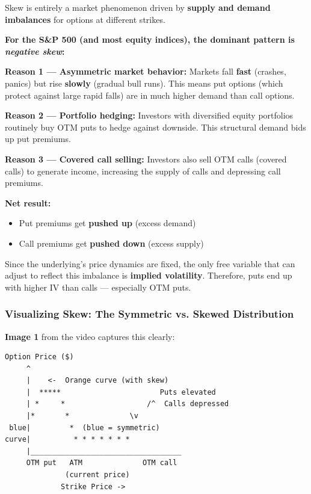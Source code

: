 \documentclass[12pt,openany]{book}
\begin{document}
Skew is entirely a market phenomenon driven by \textbf{supply and demand imbalances} for options at different strikes.

\textbf{For the S\&P 500 (and most equity indices), the dominant pattern is \emph{negative skew}:}

\textbf{Reason 1 — Asymmetric market behavior:}
Markets fall \textbf{fast} (crashes, panics) but rise \textbf{slowly} (gradual bull runs). This means put options (which protect against large rapid falls) are in much higher demand than call options.

\textbf{Reason 2 — Portfolio hedging:}
Investors with diversified equity portfolios routinely buy OTM puts to hedge against downside. This structural demand bids up put premiums.

\textbf{Reason 3 — Covered call selling:}
Investors also sell OTM calls (covered calls) to generate income, increasing the supply of calls and depressing call premiums.

\textbf{Net result:}
\begin{itemize}[leftmargin=*]
    \item Put premiums get \textbf{pushed up} (excess demand)
    \item Call premiums get \textbf{pushed down} (excess supply)
\end{itemize}

Since the underlying's price dynamics are fixed, the only free variable that can adjust to reflect this imbalance is \textbf{implied volatility}. Therefore, puts end up with higher IV than calls — especially OTM puts.

\subsubsection{Visualizing Skew: The Symmetric vs. Skewed Distribution}

\textbf{Image 1} from the video captures this clearly:

\begin{center}
\begin{Verbatim}[fontsize=\small,breaklines=true]
Option Price ($)
     ^
     |    <-  Orange curve (with skew)
     |  *****                       Puts elevated
     | *     *                   /^  Calls depressed
     |*       *              \v
 blue|         *  (blue = symmetric)
curve|          * * * * * * *
     |___________________________________
     OTM put   ATM              OTM call
              (current price)
             Strike Price ->
\end{Verbatim}
\end{center}
\end{document}
